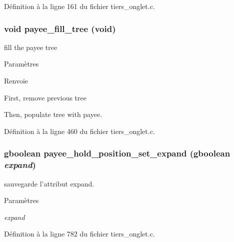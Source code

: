 Définition à la ligne 161 du fichier tiers\_\-onglet.c.

\subsubsection[{payee\_\-fill\_\-tree}]{\setlength{\rightskip}{0pt plus 5cm}void payee\_\-fill\_\-tree (void)}\label{tiers__onglet_8c_a3526c82a23ba142e443ce5c5282facf8}
fill the payee tree


\begin{DoxyParams}{Paramètres}
\item[{\em }]\end{DoxyParams}
\begin{DoxyReturn}{Renvoie}

\end{DoxyReturn}


First, remove previous tree

Then, populate tree with payee. 



Définition à la ligne 460 du fichier tiers\_\-onglet.c.

\subsubsection[{payee\_\-hold\_\-position\_\-set\_\-expand}]{\setlength{\rightskip}{0pt plus 5cm}gboolean payee\_\-hold\_\-position\_\-set\_\-expand (gboolean {\em expand})}\label{tiers__onglet_8c_ac46dd13ab4a32f28d80c2d94535b58ca}
sauvegarde l'attribut expand.


\begin{DoxyParams}{Paramètres}
\item[{\em expand}]\end{DoxyParams}


Définition à la ligne 782 du fichier tiers\_\-onglet.c.

